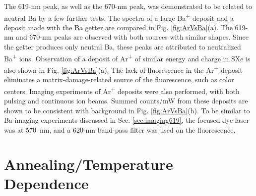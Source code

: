 The 619-nm peak, as well as the 670-nm peak, was demonstrated to be related to neutral Ba by a few further tests.  The spectra of a large Ba\textsuperscript{+} deposit and a deposit made with the Ba getter are compared in Fig. \ref{fig:ArVsBa}(a).  The 619-nm and 670-nm peaks are observed with both sources with similar shapes.  Since the getter produces only neutral Ba, these peaks are attributed to neutralized Ba\textsuperscript{+} ions.  Observation of a deposit of Ar\textsuperscript{+} of similar energy and charge in SXe is also shown in Fig. \ref{fig:ArVsBa}(a).  The lack of fluorescence in the Ar\textsuperscript{+} deposit eliminates a matrix-damage-related source of the fluorescence, such as color centers.  Imaging experiments of Ar\textsuperscript{+} deposits were also performed, with both pulsing and continuous ion beams.  Summed counts/mW from these deposits are shown to be consistent with background in Fig. \ref{fig:ArVsBa}(b).  To be similar to Ba imaging experiments discussed in Sec. \ref{sec:imaging619}, the focused dye laser was at 570~nm, and a 620-nm band-pass filter was used on the fluorescence.




\section{Annealing/Temperature Dependence}
\label{sec:tempanneal}



